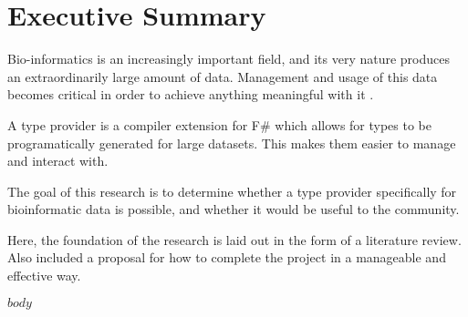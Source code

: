 \documentclass[a4paper,12pt]{article} %
\begin{document}
  
  \pagestyle{plain}
  \doublespacing

  \section*{Executive Summary}
  Bio-informatics is an increasingly important field, and its very nature
  produces an extraordinarily large amount of data. Management and usage of
  this data becomes critical in order to achieve anything meaningful with
  it \parencite{lee_bioinformatics_2012}.

  A type provider is a compiler extension for F\# which allows for types to be
  programatically generated for large datasets. This makes them easier to manage
  and interact with.

  The goal of this research is to determine whether a type provider specifically
  for bioinformatic data is possible, and whether it would be useful to the
  community.

  Here, the foundation of the research is laid out in the form of a literature
  review. Also included a proposal for how to complete the project in
  a manageable and effective way.
  \newpage

  \singlespacing
  \tableofcontents

  \newpage
  \doublespacing
  \pagestyle{fancy} %
  \setcounter{page}{1}

	\titleformat{\section}[hang]{\Large\bfseries}{}{0ex}{}{} %

  $body$

  \newpage
  \printbibliography
\end{document}
